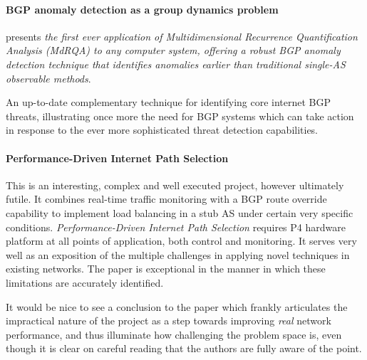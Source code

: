 \paragraph{BGP anomaly detection as a group dynamics problem}

presents  \textit{the first ever application of Multidimensional Recurrence Quantification Analysis (MdRQA) to any computer system, offering a robust BGP anomaly detection technique that identifies anomalies earlier than traditional single-AS observable methods}.

An up-to-date complementary technique for identifying core internet BGP threats, illustrating once more the need for BGP systems which can take action in response to the ever more sophisticated threat detection capabilities. 

\paragraph{Performance-Driven Internet Path Selection}

 This is an interesting, complex and well executed project, however ultimately futile.
 It combines real-time traffic monitoring with a BGP route override capability to implement load balancing in a stub AS under certain very specific conditions.  \textit{Performance-Driven Internet Path Selection} requires P4 hardware platform at all points of application, both control and monitoring.  It serves very well as an exposition of the multiple challenges in applying novel techniques in existing networks.  The paper is exceptional in the manner in which these limitations are accurately identified.

 It would be nice to see a conclusion to the paper which frankly  articulates the impractical nature of the project as a step towards improving \textit{real} network performance, and thus illuminate how challenging the problem space is, even though it is clear on careful reading that the authors are fully aware of the point.








